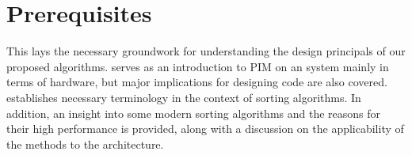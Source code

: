 \chapter{Prerequisites}
\label{sec:prereq}

This  lays the necessary groundwork for understanding the design principals of our proposed algorithms.
 serves as an introduction to \acl{PIM} on an \upmem{} system mainly in terms of hardware, but major implications for designing code are also covered.
 establishes necessary terminology in the context of sorting algorithms.
In addition, an insight into some modern sorting algorithms and the reasons for their high performance is provided, along with a discussion on the applicability of the methods to the \upmem{} architecture.





